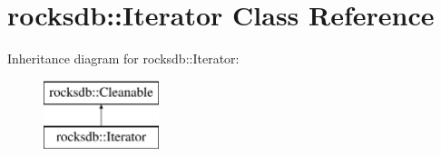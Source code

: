 \hypertarget{classrocksdb_1_1Iterator}{}\section{rocksdb\+:\+:Iterator Class Reference}
\label{classrocksdb_1_1Iterator}
Inheritance diagram for rocksdb\+:\+:Iterator\+:\begin{figure}[H]
\begin{center}
\leavevmode
\includegraphics[height=2.000000cm]{classrocksdb_1_1Iterator}
\end{center}
\end{figure}
